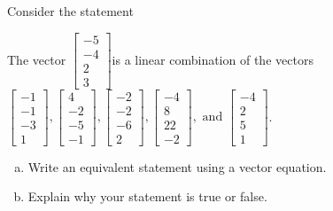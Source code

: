 
\begin{exerciseStatement}


Consider the statement 
\begin{center}\begin{minipage}{0.8\textwidth}
 The vector \( \left[\begin{array}{c}
-5 \\
-4 \\
2 \\
3
\end{array}\right] \)is a linear combination of the vectors \( \left[\begin{array}{c}
-1 \\
-1 \\
-3 \\
1
\end{array}\right] , \left[\begin{array}{c}
4 \\
-2 \\
-5 \\
-1
\end{array}\right] , \left[\begin{array}{c}
-2 \\
-2 \\
-6 \\
2
\end{array}\right] , \left[\begin{array}{c}
-4 \\
8 \\
22 \\
-2
\end{array}\right] , \text{ and } \left[\begin{array}{c}
-4 \\
2 \\
5 \\
1
\end{array}\right] \). 
\end{minipage}\end{center}
    


\begin{enumerate}[(a)]
\item  Write an equivalent statement using a vector equation.
\item  Explain why your statement is true or false.
\end{enumerate}
    
\end{exerciseStatement}
    
